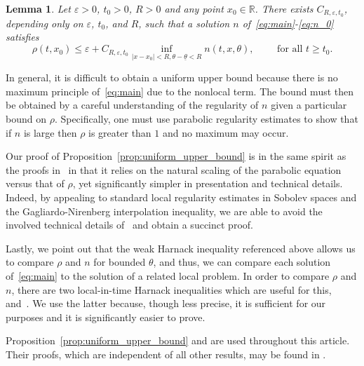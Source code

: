\documentclass[11pt]{article}    %
\newtheorem{lemma}[theorem]{Lemma}
\newcommand{\R}{\mathbb{R}}
\renewcommand{\epsilon}{\varepsilon}
\begin{document}
\begin{lemma}\label{lem:harnack}
Let $\epsilon > 0$, $t_0 > 0$, $R>0$ and any point $x_0 \in \R$.  There exists $C_{R,\epsilon,t_0}$, depending only on $\epsilon$, $t_0$, and $R$, such that a solution $n$ of~\eqref{eq:main}-\eqref{eq:n_0} satisfies
 \[
	\rho(t,x_0)
		\leq \epsilon + C_{R,\epsilon,t_0} \inf_{|x-x_0| <R , \theta-\underline\theta < R} n(t,x,\theta),
		\qquad \text{ for all } t \geq t_0.
 \]
\end{lemma}

In general, it is difficult to obtain a uniform upper bound because there is no maximum principle of~\eqref{eq:main} due to the nonlocal term.  The bound must then be obtained by a careful understanding of the regularity of $n$ given a particular bound on $\rho$.  Specifically, one must use parabolic regularity estimates to show that if $n$ is large then $\rho$ is greater than $1$ and no maximum may occur. 

Our proof of Proposition~\ref{prop:uniform_upper_bound} is in the same spirit as the proofs in~\cite{BerestyckiMouhotRaoul, HamelRyzhik, Turanova} in that it relies on the natural scaling of the parabolic equation versus that of $\rho$, yet significantly simpler in presentation and technical details.  Indeed, by appealing to standard local regularity estimates in Sobolev spaces and the Gagliardo-Nirenberg interpolation inequality, we are able to avoid the involved technical details of~\cite{BerestyckiMouhotRaoul, Turanova} and obtain a succinct proof.

Lastly, we point out that the weak Harnack inequality referenced above allows us to compare $\rho$ and $n$ for bounded $\theta$, and thus, we can compare each solution of~\eqref{eq:main} to the solution of a related local problem.  In order to compare $\rho$ and $n$, there are two local-in-time Harnack inequalities which are useful for this,~\cite[Theorem~1.2]{BHR_LogDelay} and~\cite[Theorem~2.6]{AlfaroBerestyckiRaoul}.  We use the latter because, though less precise, it is sufficient for our purposes and it is significantly easier to prove.

Proposition~\ref{prop:uniform_upper_bound} and  are used throughout this article.  Their proofs, which are independent of all other results, may be found in . %
\end{document}
